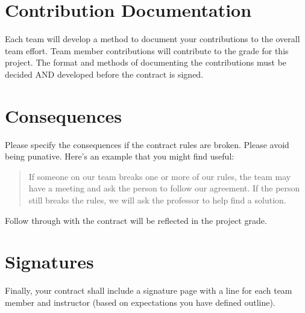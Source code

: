 \documentclass{article}\usepackage[]{graphicx}\usepackage[]{color}
\begin{document}
\section{Contribution Documentation}

Each team will develop a method to document your contributions to the overall team effort. Team member contributions will contribute to the grade for this project. The format and methods of documenting the contributions must be decided AND developed before the contract is signed.

\section{Consequences}

Please specify the consequences if the contract rules are broken. Please avoid being punative. Here's an example that you might find useful:

\begin{quote}
If someone on our team breaks one or more of our rules, the team may have a meeting and ask the person to follow our agreement. If the person still breaks the rules, we will ask the professor to help ﬁnd a solution.
\end{quote}

Follow through with the contract will be reflected in the project grade.

\section{Signatures}

Finally, your contract shall include a signature page with a line for each team member and instructor (based on expectations you have defined outline).
\end{document}
